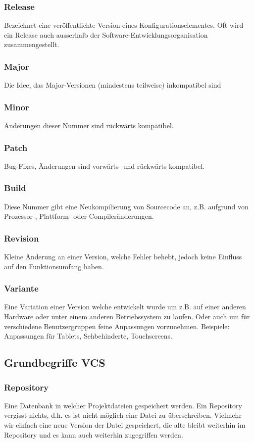 \documentclass[10pt]{article}
\begin{document}
\subsubsection{Release}
Bezeichnet eine veröffentlichte Version eines Konfigurationselementes. Oft wird ein Release auch ausserhalb der Software-Entwicklungsorganisation zusammengestellt.
\subsubsection{Major}
Die Idee, das Major-Versionen (mindestens teilweise) inkompatibel sind
\subsubsection{Minor}
Änderungen dieser Nummer sind rückwärts kompatibel.
\subsubsection{Patch}
Bug-Fixes, Änderungen sind vorwärts- und rückwärts kompatibel.
\subsubsection{Build}
Diese Nummer gibt eine Neukompilierung von Sourcecode an, z.B. aufgrund von Prozessor-, Plattform- oder Compileränderungen.
\subsubsection{Revision}
Kleine Änderung an einer Version, welche Fehler behebt, jedoch keine Einfluss auf den Funktionsumfang haben.
\subsubsection{Variante}
Eine Variation einer Version welche entwickelt wurde um z.B. auf einer anderen Hardware oder unter einem anderen Betriebssystem zu laufen. Oder auch um für verschiedene Benutzergruppen feine Anpassungen vorzunehmen.  Beispiele: Anpassungen für Tablets, Sehbehinderte, Touchscreens.
\subsection{Grundbegriffe VCS}
\subsubsection{Repository}
Eine Datenbank in welcher Projektdateien gespeichert werden. Ein Repository vergisst nichts, d.h. es ist nicht möglich eine Datei zu überschreiben. Vielmehr wir einfach eine neue Version der Datei gespeichert, die alte bleibt weiterhin im Repository und es kann auch weiterhin zugegriffen werden.
\end{document}
